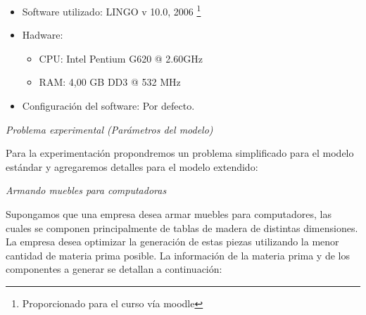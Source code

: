 \documentclass[journal, 10pt]{IEEEtran}
\begin{document}
		\begin{itemize}
		\item 
			Software utilizado: LINGO v 10.0, 2006
		\footnote{Proporcionado para el curso vía moodle}
		
		\item 
			Hadware: 
			\begin{itemize}
				\item 
					CPU: Intel Pentium G620 @ 2.60GHz
				\item 
					RAM: 4,00 GB DD3 @ 532 MHz
			\end{itemize}
		
		\item 
			Configuración del software: Por defecto.
		
		\end{itemize}
		
		\emph{Problema experimental (Parámetros del modelo)}
		
		Para la experimentación propondremos un problema simplificado para
		el modelo estándar y agregaremos detalles para el modelo extendido:
		
		\emph{Armando muebles para computadoras}
		
		Supongamos que una empresa desea armar muebles para computadores,
		las cuales se componen principalmente de tablas de madera de distintas
		dimensiones. La empresa desea optimizar la generación de estas piezas 
		utilizando la menor cantidad de materia prima posible. La información
		de la materia prima y de los componentes a generar se detallan a 
		continuación:
		
\end{document}
